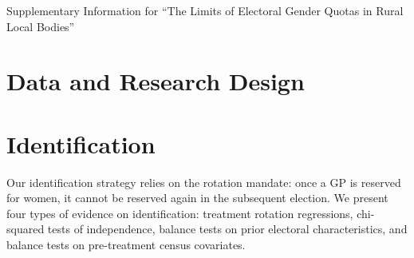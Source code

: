 \documentclass[12pt]{article}
\begin{document}
\clearpage
\newpage



\clearpage
\newpage
\begin{center}
 \vspace{36pt}
\LARGE{Supplementary Information for ``The Limits of Electoral Gender Quotas in Rural Local
Bodies''}
\end{center}

\appendix
\doublespacing
\thispagestyle{empty}

\renewcommand{\thetable}{\thesection\arabic{table}}
\renewcommand{\thefigure}{\thesection\arabic{figure}}

\renewcommand{\contentsname}{Appendix Contents}
\startcontents[appendix]
\clearpage
\newpage

\doublespacing


\section{Data and Research Design}\label{sec:app_data}

\FloatBarrier
\FloatBarrier


\clearpage
\section{Identification}\label{sec:app_identification}

Our identification strategy relies on the rotation mandate: once a GP is reserved for women, it cannot be reserved again in the subsequent election. We present four types of evidence on identification: treatment rotation regressions, chi-squared tests of independence, balance tests on prior electoral characteristics, and balance tests on pre-treatment census covariates.
\end{document}
